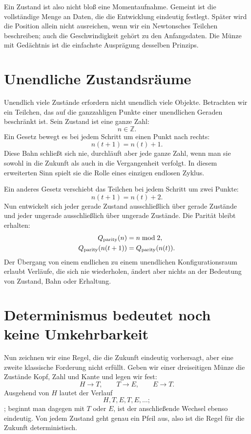 Ein Zustand ist also nicht bloß eine Momentaufnahme. Gemeint ist die vollständige Menge an Daten, die die Entwicklung eindeutig festlegt. Später wird die Position allein nicht ausreichen, wenn wir ein Newtonsches Teilchen beschreiben; auch die Geschwindigkeit gehört zu den Anfangsdaten. Die Münze mit Gedächtnis ist die einfachste Ausprägung desselben Prinzips.

\section{Unendliche Zustandsräume}

Unendlich viele Zustände erfordern nicht unendlich viele Objekte. Betrachten wir ein Teilchen, das auf die ganzzahligen Punkte einer unendlichen Geraden beschränkt ist. Sein Zustand ist eine ganze Zahl: \[
  n\in\mathbb Z.
\]Ein Gesetz bewegt es bei jedem Schritt um einen Punkt nach rechts: \begin{equation}
  n(t+1)=n(t)+1.
  \label{eq:lattice-one}
\end{equation}Diese Bahn schließt sich nie, durchläuft aber jede ganze Zahl, wenn man sie sowohl in die Zukunft als auch in die Vergangenheit verfolgt. In diesem erweiterten Sinn spielt sie die Rolle eines einzigen endlosen Zyklus.

Ein anderes Gesetz verschiebt das Teilchen bei jedem Schritt um zwei Punkte: \begin{equation}
  n(t+1)=n(t)+2.
  \label{eq:lattice-two}
\end{equation}Nun entwickelt sich jeder gerade Zustand ausschließlich über gerade Zustände und jeder ungerade ausschließlich über ungerade Zustände. Die Parität bleibt erhalten: \begin{equation}
  \begin{aligned}
    Q_{\rm parity}(n)&=n\bmod 2,\\
    Q_{\rm parity}(n(t+1))&=Q_{\rm parity}(n(t)).
  \end{aligned}
\end{equation}Der Übergang von einem endlichen zu einem unendlichen Konfigurationsraum erlaubt Verläufe, die sich nie wiederholen, ändert aber nichts an der Bedeutung von Zustand, Bahn oder Erhaltung.

\section{Determinismus bedeutet noch keine Umkehrbarkeit}

Nun zeichnen wir eine Regel, die die Zukunft eindeutig vorhersagt, aber eine zweite klassische Forderung nicht erfüllt. Geben wir einer dreiseitigen Münze die Zustände Kopf, Zahl und Kante und legen wir fest: \begin{equation}
  H\to T,
  \qquad
  T\to E,
  \qquad
  E\to T.
  \label{eq:nonreversible-map}
\end{equation}Ausgehend von \(H\) lautet der Verlauf \[
  H,T,E,T,E,\ldots;
\]; beginnt man dagegen mit \(T\) oder \(E\), ist der anschließende Wechsel ebenso eindeutig. Von jedem Zustand geht genau ein Pfeil aus, also ist die Regel für die Zukunft deterministisch.

